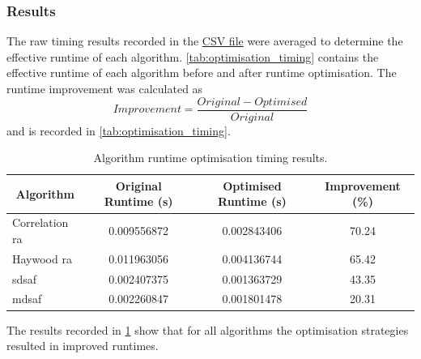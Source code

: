 \documentclass[class=report,11pt,crop=false]{standalone}
\begin{document}
    \subsubsection{Results}
    The raw timing results recorded in the \href{}{CSV file} were averaged to determine the effective runtime of each algorithm. \autoref{tab:optimisation_timing} contains the effective runtime of each algorithm before and after runtime optimisation. The runtime improvement was calculated as
    \begin{equation}
        Improvement = \frac{Original-Optimised}{Original}
    \end{equation}
    and is recorded in \autoref{tab:optimisation_timing}.

    \begin{table}
        \centering
        \begin{tabular}{|l|c|c|c|}
            \hline
            \multicolumn{1}{|c|}{\textbf{Algorithm}} & \textbf{Original Runtime (s)}&\textbf{Optimised Runtime (s)} &\textbf{Improvement (\%)} \\
            \hline
            Correlation \gls{ra}    & 0.009556872 & 0.002843406 & 70.24 \\
            \hline
            Haywood \gls{ra}        & 0.011963056 & 0.004136744 & 65.42  \\
            \hline
            \gls{sdsaf}             & 0.002407375 & 0.001363729 & 43.35  \\
            \hline
            \gls{mdsaf}             & 0.002260847 & 0.001801478 & 20.31 \\
            \hline
        \end{tabular}
        \caption{Algorithm runtime optimisation timing results. \label{tab:optimisation_timing}}
    \end{table}

    The results recorded in \ref{tab:optimisation_timing} show that for all algorithms the optimisation strategies resulted in improved runtimes.

\end{document}
